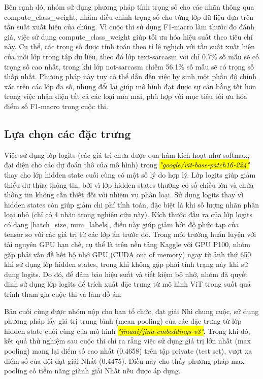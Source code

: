 \documentclass[11pt]{article}
\begin{document}
Bên cạnh đó, nhóm sử dụng phương pháp tính trọng số cho các nhãn thông qua compute\_class\_weight, nhằm điều chỉnh trọng số cho từng lớp dữ liệu dựa trên tần suất xuất hiện của chúng. Vì cuộc thi sử dụng F1-macro làm thước đo đánh giá, việc sử dụng compute\_class\_weight giúp tối ưu hóa hiệu suất theo tiêu chí này. Cụ thể, các trọng số được tính toán theo tỉ lệ nghịch với tần suất xuất hiện của mỗi lớp trong tập dữ liệu, theo đó lớp text-sarcasm với chỉ 0.7\% số mẫu sẽ có trọng số cao nhất, trong khi lớp not-sarcasm chiếm 56.1\% số mẫu sẽ có trọng số thấp nhất. Phương pháp này tuy có thể dẫn đến việc hy sinh một phần độ chính xác trên các lớp đa số, nhưng đổi lại giúp mô hình đạt được sự cân bằng tốt hơn trong việc nhận diện tất cả các loại mỉa mai, phù hợp với mục tiêu tối ưu hóa điểm số F1-macro trong cuộc thi.
\vspace*{-2mm}
\subsection{Lựa chọn các đặc trưng}
\hspace*{5mm}Việc sử dụng lớp logits (các giá trị chưa được qua hàm kích hoạt như softmax, đại diện cho các dự đoán thô của mô hình) trong \hl{\textit{"google/vit-base-patch16-224"}} thay cho lớp hidden state cuối cùng có một số lý do hợp lý. Lớp logits giúp giảm thiểu dư thừa thông tin, bởi vì lớp hidden states thường có số chiều lớn và chứa thông tin không cần thiết đối với nhiệm vụ phân loại. Sử dụng logits thay vì hidden states còn giúp giảm chi phí tính toán, đặc biệt là khi số lượng nhãn phân loại nhỏ (chỉ có 4 nhãn trong nghiên cứu này). Kích thước đầu ra của lớp logits có dạng [batch\_size, num\_labels], điều này giúp giảm bớt độ phức tạp của tensor so với các giá trị từ các lớp ẩn trước đó. Trong môi trường huấn luyện với tài nguyên GPU hạn chế, cụ thể là trên nền tảng Kaggle với GPU P100, nhóm gặp phải vấn đề hết bộ nhớ GPU (CUDA out of memory) ngay từ ảnh thứ 650 khi sử dụng lớp hidden states, trong khi không gặp phải tình trạng này khi sử dụng logits. Do đó, để đảm bảo hiệu suất và tiết kiệm bộ nhớ, nhóm đã quyết định sử dụng lớp logits để trích xuất đặc trưng từ mô hình ViT trong suốt quá trình tham gia cuộc thi và làm đồ án.

Bản cuối cùng được nhóm nộp cho ban tổ chức, đạt giải Nhì chung cuộc, sử dụng phương pháp lấy giá trị trung bình (mean pooling) của các đặc trưng từ lớp hidden state cuối cùng của mô hình \hl{\textit{"jinaai/jina-embeddings-v3"}}. Trong khi đó, kết quả thử nghiệm sau cuộc thi chỉ ra rằng việc sử dụng giá trị lớn nhất (max pooling) mang lại điểm số cao nhất (0.4658) trên tập private (test set), vượt xa điểm số của đội đạt giải Nhất (0.4475). Điều này cho thấy phương pháp max pooling có tiềm năng giành giải Nhất nếu được áp dụng.
\end{document}
